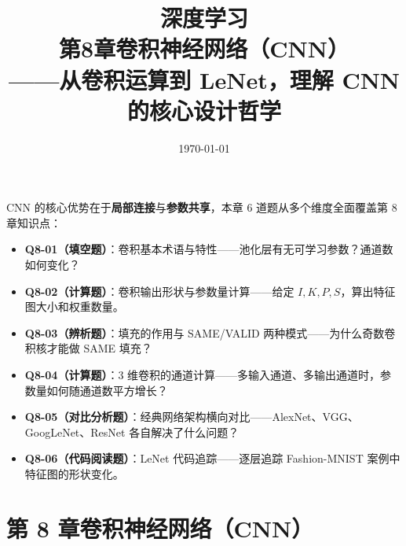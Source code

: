 \documentclass[a4paper,11pt]{ctexart}
\title{\textbf{深度学习\\第8章\quad 卷积神经网络（CNN）}\\[0.5em]
{\large\color{gray}——从卷积运算到 LeNet，理解 CNN 的核心设计哲学}}
\date{\today}
\begin{document}
\maketitle

\begin{beginnerbox}
    CNN 的核心优势在于\textbf{局部连接}与\textbf{参数共享}，本章 6 道题从多个维度全面覆盖第 8 章知识点：

    \begin{itemize}
        \item \textbf{Q8-01（填空题）}：卷积基本术语与特性——池化层有无可学习参数？通道数如何变化？
        \item \textbf{Q8-02（计算题）}：卷积输出形状与参数量计算——给定 $I, K, P, S$，算出特征图大小和权重数量。
        \item \textbf{Q8-03（辨析题）}：填充的作用与 SAME/VALID 两种模式——为什么奇数卷积核才能做 SAME 填充？
        \item \textbf{Q8-04（计算题）}：3 维卷积的通道计算——多输入通道、多输出通道时，参数量如何随通道数平方增长？
        \item \textbf{Q8-05（对比分析题）}：经典网络架构横向对比——AlexNet、VGG、GoogLeNet、ResNet 各自解决了什么问题？
        \item \textbf{Q8-06（代码阅读题）}：LeNet 代码追踪——逐层追踪 Fashion-MNIST 案例中特征图的形状变化。
    \end{itemize}
\end{beginnerbox}

\section{第 8 章\quad 卷积神经网络（CNN）}
\end{document}
